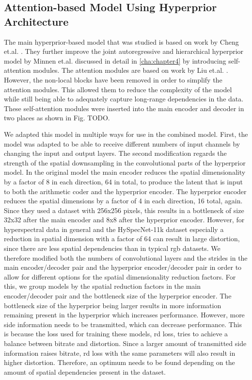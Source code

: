 \subsection{Attention-based Model Using Hyperprior Architecture\label{sec:atthyperprior}}
The main hyperprior-based model that was studied is based on work by Cheng et.al. \citep{cheng_learned_2020}. They further improve the joint autoregressive and hierarchical hyperprior model by Minnen et.al. \citep{minnen_joint_2018} discussed in detail in \autoref{cha:chapter4} by introducing self-attention modules. The attention modules are based on work by Liu et.al. \citep{liu_non-local_2019}. However, the non-local blocks have been removed in order to simplify the attention modules. This allowed them to reduce the complexity of the model while still being able to adequately capture long-range dependencies in the data. These self-attention modules were inserted into the main encoder and decoder in two places as shown in Fig. TODO.

We adapted this model in multiple ways for use in the combined model. First, the model was adapted to be able to receive different numbers of input channels by changing the input and output layers. The second modification regards the strength of the spatial downsampling in the convolutional parts of the hyperprior model. In the original model the main encoder reduces the spatial dimensionality by a factor of 8 in each direction, 64 in total, to produce the latent that is input to both the arithmetic coder and the hyperprior encoder. The hyperprior encoder reduces the spatial dimensions by a factor of 4 in each direction, 16  total, again. Since they used a dataset with 256x256 pixels, this results in a bottleneck of size 32x32 after the main encoder and 8x8 after the hyperprior encoder. However, for hyperspectral data in general and the HySpecNet-11k dataset especially a reduction in spatial dimension with a factor of 64 can result in large distortion, since there are less spatial dependencies than in typical \ac{rgb} datasets. We therefore modified both the numbers of convolutional layers and the strides in the main encoder/decoder pair and the hyperprior encoder/decoder pair in order to allow for different options for the spatial dimensionality reduction factors. For this, we group models by the spatial reduction factors in the main encoder/decoder pair and the bottleneck size of the hyperprior encoder. The bottleneck size of the hyperprior being larger results in more information remaining present in the hyperprior which increases performance. However, more side information needs to be transmitted, which can decrease performance. This is because the loss used for training these models, \ac{rd} loss, tries to achieve a balance between bitrate and distortion. Since a larger amount of transmitted side information raises bitrate, \ac{rd} loss with the same parameters will also result in higher distortion. Therefore, an optimum needs to be found depending on the amount of spatial dependencies present in the dataset.
